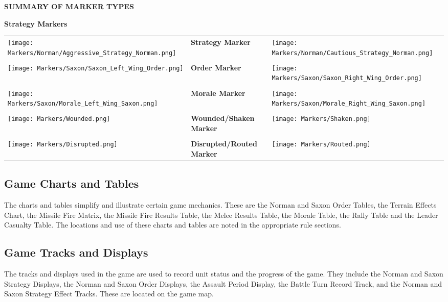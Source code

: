 \break

\par
\begin{center}
  \textbf{SUMMARY OF MARKER TYPES}
  \break
  \par
  \textbf{Strategy Markers}
\end{center}

\begin{tabularx}{0.5\textwidth}{
    >{\raggedright\arraybackslash}X
    >{\centering\arraybackslash}X
    >{\raggedleft\arraybackslash}X}
  \texttt{[image: Markers/Norman/Aggressive\_Strategy\_Norman.png]} &
  \textbf{Strategy Marker} &
  \texttt{[image: Markers/Norman/Cautious\_Strategy\_Norman.png]} \\ \\
  \texttt{[image: Markers/Saxon/Saxon\_Left\_Wing\_Order.png]} &
  \textbf{Order Marker} &
  \texttt{[image: Markers/Saxon/Saxon\_Right\_Wing\_Order.png]} \\ \\
  \texttt{[image: Markers/Saxon/Morale\_Left\_Wing\_Saxon.png]} &
  \textbf{Morale Marker} &
  \texttt{[image: Markers/Saxon/Morale\_Right\_Wing\_Saxon.png]} \\ \\
  \texttt{[image: Markers/Wounded.png]} &
  \textbf{Wounded/Shaken Marker} &
  \texttt{[image: Markers/Shaken.png]} \\ \\
  \texttt{[image: Markers/Disrupted.png]} &
  \textbf{Disrupted/Routed Marker} &
  \texttt{[image: Markers/Routed.png]}
\end{tabularx}


\subsection{Game Charts and Tables}


The charts and tables simplify and illustrate certain game mechanics. These are the Norman and Saxon Order Tables, the Terrain Effects Chart, the Missile Fire Matrix, the Missile Fire Results Table, the Melee Results Table, the Morale Table, the Rally Table and the Leader Casualty Table. The locations and use of these charts and tables are noted in the appropriate rule sections.

\subsection{Game Tracks and Displays}

The tracks and displays used in the game are used to record unit status and the progress of the game. They include the Norman and Saxon Strategy Displays, the Norman and Saxon Order Displays, the Assault Period Display, the Battle Turn Record Track, and the Norman and Saxon Strategy Effect Tracks. These are located on the game map.

